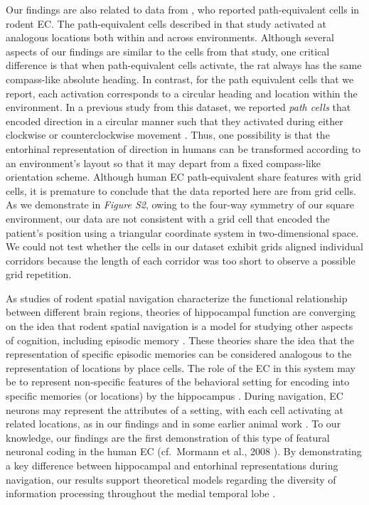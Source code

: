 Our findings are also related to data from \citet{FranEtal00}, who reported path-equivalent cells in rodent EC.  The path-equivalent cells described in that study activated at analogous locations both within and across environments.  Although several aspects of our findings are similar to the cells from that study, one critical difference is that when path-equivalent cells activate, the rat always has the same compass-like absolute heading.  In contrast, for the path equivalent cells that we report, each activation corresponds to a circular heading and location within the environment.  In a previous study from this dataset, we reported \emph{path cells} that encoded direction in a circular manner such that they activated during either clockwise or counterclockwise movement \citep{JacoEtal10}.  Thus, one possibility is that the entorhinal representation of direction in humans can be transformed according to an environment's layout so that it may depart from a fixed compass-like orientation scheme. Although human EC path-equivalent share features with grid cells, it is premature to conclude that the data reported here are from grid cells.  As we demonstrate in \emph{Figure S2}, owing to the four-way symmetry of our square environment, our data are not consistent with a grid cell that encoded the patient's position using a triangular coordinate system in two-dimensional space.  We could not test whether the cells in our dataset exhibit grids aligned  individual corridors \cite{DerdEtal09} because the length of each corridor was too short to observe a possible grid repetition.
 
As studies of rodent spatial navigation characterize the functional relationship between different brain regions, theories of hippocampal function are converging on the idea that rodent spatial navigation is a model for studying other aspects of cognition, including episodic memory \citep{EichEtal99,Buzs05,BuzsMose13,MoseMose13}. These theories share the idea that the representation of specific episodic memories can be considered analogous to the representation of locations by place cells. The role of the EC in this system may be to represent non-specific features of the behavioral setting \citep{HaftEtal05,SolsEtal08,SargEtal06,JacoEtal13,JacoEtal10} for encoding into specific memories (or locations) by the hippocampus \cite{NormORei03}. During navigation, EC neurons may  represent the attributes of a setting, with each cell activating at related   locations, as in our findings and in some earlier animal work  \cite{FranEtal00}.  To our knowledge, our findings are the first demonstration of this type of featural neuronal coding in the human EC (cf.\ Mormann et al., 2008 \cite{MormEtal08}). By demonstrating a key difference between hippocampal and entorhinal representations during navigation, our results support theoretical models regarding the diversity of information processing throughout the medial temporal lobe \cite{NormORei03,KnieEtal06,SolsEtal06}. 
 



